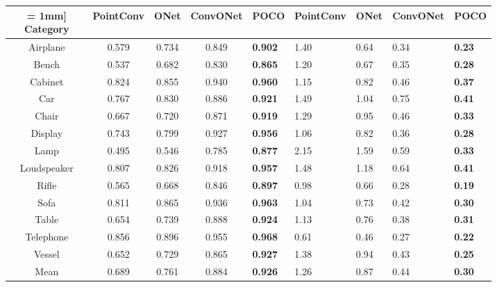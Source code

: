 \documentclass[10pt,twocolumn,letterpaper]{article}
\newcommand\OURS{{POCO}}
\begin{document}
\begin{figure}[t]
\begin{figure}[t]
\begin{tabular}{cccc}
     = 
1mm] 
        Category    & PointConv & ONet & \!ConvONet\! & \OURS & PointConv & ONet & \!ConvONet\! & \OURS \\
        \midrule
        Airplane    & 0.579 & 0.734 & 0.849 & \bf 0.902 & 1.40 & 0.64 & 0.34 & \bf 0.23	\\
        Bench       & 0.537 & 0.682 & 0.830 & \bf 0.865 & 1.20 & 0.67 & 0.35 & \bf 0.28\\
        Cabinet     & 0.824 & 0.855 & 0.940 & \bf 0.960 & 1.15 & 0.82 & 0.46 & \bf 0.37\\
        Car         & 0.767 & 0.830 & 0.886 & \bf 0.921	& 1.49 & 1.04 & 0.75 & \bf 0.41\\
        Chair       & 0.667 & 0.720 & 0.871 & \bf 0.919	& 1.29 & 0.95 & 0.46 & \bf 0.33\\
        Display     & 0.743 & 0.799 & 0.927 & \bf 0.956	& 1.06 & 0.82 & 0.36 & \bf 0.28\\
        Lamp        & 0.495 & 0.546 & 0.785 & \bf 0.877	& 2.15 & 1.59 & 0.59 & \bf 0.33\\
        Loudspeaker & 0.807 & 0.826 & 0.918 & \bf 0.957	& 1.48 & 1.18 & 0.64 & \bf 0.41\\
        Rifle       & 0.565 & 0.668 & 0.846 & \bf 0.897	& 0.98 & 0.66 & 0.28 & \bf 0.19\\
        Sofa        & 0.811 & 0.865 & 0.936 & \bf 0.963	& 1.04 & 0.73 & 0.42 & \bf 0.30\\
        Table       & 0.654 & 0.739 & 0.888 & \bf 0.924	& 1.13 & 0.76 & 0.38 & \bf 0.31\\
        Telephone   & 0.856 & 0.896 & 0.955 & \bf 0.968	& 0.61 & 0.46 & 0.27 & \bf 0.22\\
        Vessel      & 0.652 & 0.729 & 0.865 & \bf 0.927	& 1.38 & 0.94 & 0.43 & \bf 0.25\\
        \midrule
        Mean        & 0.689 & 0.761 & 0.884 & \bf 0.926	& 1.26 & 0.87 & 0.44 & \bf 0.30\\
    \end{tabular}
    
    \bigskip
    

\end{figure}
\end{figure}
\end{document}
